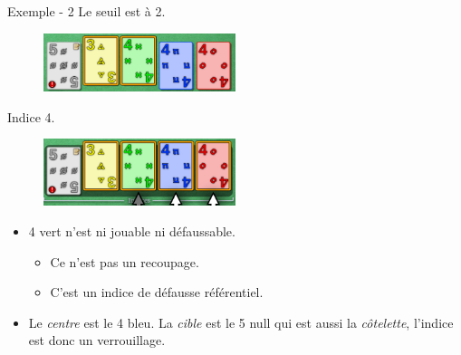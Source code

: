\documentclass{beamer}
\begin{document}
\begin{frame}{Exemple - 2}
    Le seuil est à 2.
    \begin{figure}[h]
        \includegraphics[width=0.5\textwidth]{lock_before.png}
    \end{figure}
    Indice 4.
    \begin{figure}[h]
        \includegraphics[width=0.5\textwidth]{lock_after.png}
    \end{figure}
    \begin{itemize}
    \item 4 vert n'est ni jouable ni défaussable.
        \begin{itemize}
            \item Ce n'est pas un recoupage.
            \item C'est un indice de défausse référentiel.
        \end{itemize}
        \item Le \emph{centre} est le 4 bleu. La \emph{cible} est le 5 null qui
              est aussi la \emph{côtelette}, l'indice est donc un verrouillage.
    \end{itemize}
\end{frame}




\end{document}

